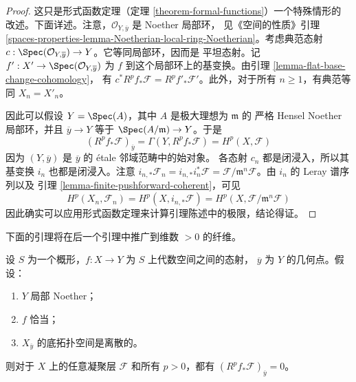 \begin{proof}
这只是形式函数定理（定理 \ref{theorem-formal-functions}）一个特殊情形的
改述。下面详述。注意，$\mathcal{O}_{Y, \overline{y}}$ 是 Noether 局部环，
见《空间的性质》引理
\ref{spaces-properties-lemma-Noetherian-local-ring-Noetherian}。考虑典范态射
$c : \Spec(\mathcal{O}_{Y, \overline{y}}) \to Y$。它等同局部环，因而是
平坦态射。记 $f' : X' \to \Spec(\mathcal{O}_{Y, \overline{y}})$ 为 $f$
到这个局部环上的基变换。由引理 \ref{lemma-flat-base-change-cohomology}，
有 $c^*R^pf_*\mathcal{F} = R^pf'_*\mathcal{F}'$。此外，对于所有
$n \geq 1$，有典范等同 $X_n = X'_n$。

\medskip\noindent
因此可以假设 $Y = \Spec(A)$，其中 $A$ 是极大理想为 $\mathfrak m$ 的
严格 Hensel Noether 局部环，并且 $\overline{y} \to Y$ 等于
$\Spec(A/\mathfrak m) \to Y$。于是
$$
\left(R^pf_*\mathcal{F}\right)_{\overline{y}} =
\Gamma(Y, R^pf_*\mathcal{F}) =
H^p(X, \mathcal{F})
$$
因为 $(Y, \overline{y})$ 是 $\overline{y}$ 的 \'etale 邻域范畴中的始对象。
各态射 $c_n$ 都是闭浸入，所以其基变换 $i_n$ 也都是闭浸入。注意
$i_{n, *}\mathcal{F}_n = i_{n, *}i_n^*\mathcal{F}
= \mathcal{F}/\mathfrak m^n\mathcal{F}$。由 $i_n$ 的 Leray 谱序列以及
引理 \ref{lemma-finite-pushforward-coherent}，可见
$$
H^p(X_n, \mathcal{F}_n) =
H^p(X, i_{n, *}\mathcal{F}) =
H^p(X, \mathcal{F}/\mathfrak m^n\mathcal{F})
$$
因此确实可以应用形式函数定理来计算引理陈述中的极限，结论得证。
\end{proof}

\noindent
下面的引理将在后一个引理中推广到维数 $>0$ 的纤维。

\begin{lemma}
\label{lemma-higher-direct-images-zero-finite-fibre}
设 $S$ 为一个概形，$f : X \to Y$ 为 $S$ 上代数空间之间的态射，
$\overline{y}$ 为 $Y$ 的几何点。假设：
\begin{enumerate}
\item $Y$ 局部 Noether；
\item $f$ 恰当；
\item $X_{\overline{y}}$ 的底拓扑空间是离散的。
\end{enumerate}
则对于 $X$ 上的任意凝聚层 $\mathcal{F}$ 和所有 $p > 0$，都有
$(R^pf_*\mathcal{F})_{\overline{y}} = 0$。
\end{lemma}

